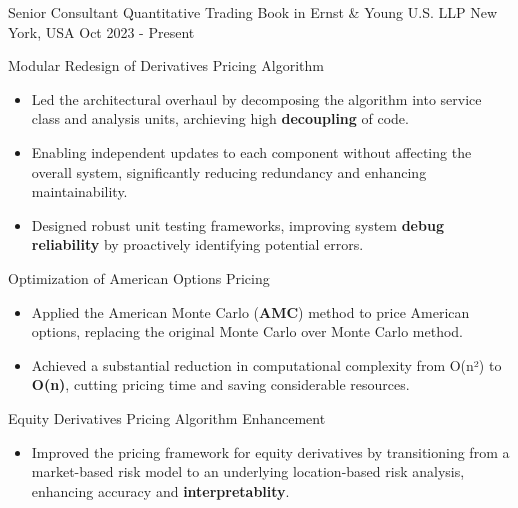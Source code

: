 

\begin{cventries}

  \cventry
    {Senior Consultant} %
    {Quantitative Trading Book in Ernst \& Young U.S. LLP} %
    {New York, USA} %
    {Oct 2023 - Present} %
    {
      \begin{cvitems}
        \item Modular Redesign of Derivatives Pricing Algorithm
        \begin{itemize}
          \item Led the architectural overhaul by decomposing the algorithm into service class and analysis units, archieving high \textbf{decoupling} of code.
          \item Enabling independent updates to each component without affecting the overall system, significantly reducing redundancy and enhancing maintainability.
          \item Designed robust unit testing frameworks, improving system \textbf{debug reliability} by proactively identifying potential errors.
        \end{itemize}
        \item Optimization of American Options Pricing
        \begin{itemize}
          \item Applied the American Monte Carlo (\textbf{AMC}) method to price American options, replacing the original Monte Carlo over Monte Carlo method. 
          \item Achieved a substantial reduction in computational complexity from O(n²) to \textbf{O(n)}, cutting pricing time and saving considerable resources.
        \end{itemize}
        \item Equity Derivatives Pricing Algorithm Enhancement
        \begin{itemize}
          \item Improved the pricing framework for equity derivatives by transitioning from a market-based risk model to an underlying location-based risk analysis, enhancing accuracy and \textbf{interpretablity}.

\end{itemize}
\end{cvitems}}
\end{cventries}
